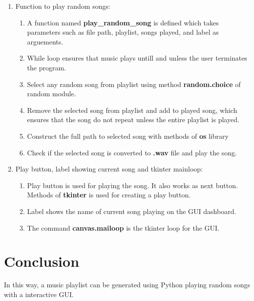 \documentclass[journal,12pt,twocolumn]{IEEEtran}
\begin{document}
\begin{enumerate}
\begin{enumerate}
		\end{enumerate}
	\item
		Function to play random songs:
		\begin{enumerate}
			\item[\textbullet]
				A function named \textbf{play\_random\_song} is defined which takes parameters such as file path, playlist, songs played, and label as arguements.
			\item[\textbullet]
				While loop ensures that music plays untill and unless the user terminates the program.
			\item[\textbullet]
				Select any random song from playlist using method \textbf{random.choice} of random module.
			\item[\textbullet]
				Remove the selected song from playlist and add to played song, which ensures that the song do not repeat unless the entire playlist is played.
			\item[\textbullet]
				Construct the full path to selected song with methods of \textbf{os} library
			\item[\textbullet]
				Check if the selected song is converted to \textbf{.wav} file and play the song.
		\end{enumerate}
	\item
		Play button, label showing current song and tkinter mainloop:
		\begin{enumerate}
			\item[\textbullet]
				Play button is used for playing the song. It also works as next button. Methods of \textbf{tkinter} is used for creating a play button.
			\item[\textbullet]
				Label shows the name of current song playing on the GUI dashboard.
			\item[\textbullet]
				The command \textbf{canvas.mailoop} is the tkinter loop for the GUI.
		\end{enumerate}

\end{enumerate}
\section*{\textbf{Conclusion}}
In this way, a music playlist can be generated using Python playing random songs with a interactive GUI.
\end{document}
